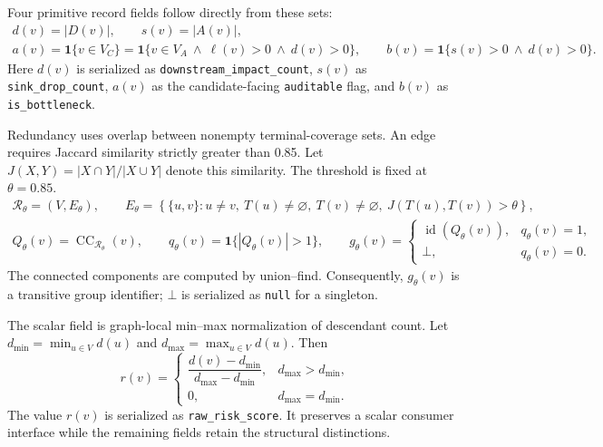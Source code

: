 \documentclass[pdflatex,sn-basic]{sn-jnl}
\begin{document}
Four primitive record fields follow directly from these sets:
\begin{equation}
\begin{gathered}
d(v)=|D(v)|,\qquad s(v)=|A(v)|,\\
a(v)=\mathbf{1}\{v\in V_C\}
=\mathbf{1}\{v\in V_A\ \wedge\ \ell(v)>0\ \wedge\ d(v)>0\},\qquad
b(v)=\mathbf{1}\{s(v)>0\ \wedge\ d(v)>0\}.
\end{gathered}
\label{eq:record-fields}
\end{equation}
Here $d(v)$ is serialized as \texttt{downstream\_impact\_count}, $s(v)$ as \texttt{sink\_drop\_count}, $a(v)$ as the candidate-facing \texttt{auditable} flag, and $b(v)$ as \texttt{is\_bottleneck}.

\begin{samepage}
Redundancy uses overlap between nonempty terminal-coverage sets. An edge requires Jaccard similarity strictly greater than 0.85. Let $J(X,Y)=|X\cap Y|/|X\cup Y|$ denote this similarity. The threshold is fixed at $\theta=0.85$.
\begin{equation}
\begin{gathered}
\mathcal{R}_{\theta}=(V,E_{\theta}),\qquad
E_{\theta}=\left\{\{u,v\}:u\ne v,\ T(u)\ne\varnothing,\ T(v)\ne\varnothing,
\ J(T(u),T(v))>\theta\right\},\\
Q_{\theta}(v)=\operatorname{CC}_{\mathcal{R}_{\theta}}(v),\qquad
q_{\theta}(v)=\mathbf{1}\{|Q_{\theta}(v)|>1\},\qquad
g_{\theta}(v)=
\begin{cases}
\operatorname{id}(Q_{\theta}(v)), & q_{\theta}(v)=1,\\
\bot, & q_{\theta}(v)=0.
\end{cases}
\end{gathered}
\label{eq:redundancy-graph}
\end{equation}
The connected components are computed by union--find. Consequently, $g_{\theta}(v)$ is a transitive group identifier; $\bot$ is serialized as \texttt{null} for a singleton.
\end{samepage}

The scalar field is graph-local min--max normalization of descendant count. Let $d_{\min}=\min_{u\in V}d(u)$ and $d_{\max}=\max_{u\in V}d(u)$. Then
\begin{equation}
r(v)=
\begin{cases}
\dfrac{d(v)-d_{\min}}{d_{\max}-d_{\min}}, & d_{\max}>d_{\min},\\[5pt]
0, & d_{\max}=d_{\min}.
\end{cases}
\label{eq:raw-risk}
\end{equation}
The value $r(v)$ is serialized as \texttt{raw\_risk\_score}. It preserves a scalar consumer interface while the remaining fields retain the structural distinctions.
\end{document}
